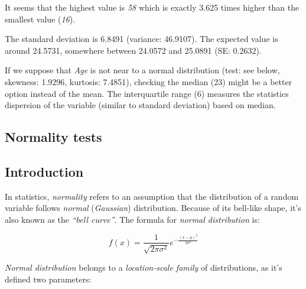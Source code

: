 \documentclass{article}
\begin{document}
It seems that the highest value is \emph{58} which is exactly 3.625
times higher than the smallest value (\emph{16}).

The standard deviation is 6.8491 (variance: 46.9107). The expected value
is around 24.5731, somewhere between 24.0572 and 25.0891 (SE: 0.2632).

If we suppose that \emph{Age} is not near to a normal distribution
(test: see below, skewness: 1.9296, kurtosis: 7.4851), checking the
median (23) might be a better option instead of the mean. The
interquartile range (6) measures the statistics dispersion of the
variable (similar to standard deviation) based on median.

\subsection{Normality tests}

\subsection{Introduction}

In statistics, \emph{normality} refers to an assumption that the
distribution of a random variable follows \emph{normal}
(\emph{Gaussian}) distribution. Because of its bell-like shape, it's
also known as the \emph{``bell curve''}. The formula for \emph{normal
distribution} is:

\[f(x) = \frac{1}{\sqrt{2\pi{}\sigma{}^2}} e^{-\frac{(x-\mu{})^2}{2\sigma{}^2}}\]

\emph{Normal distribution} belongs to a \emph{location-scale family} of
distributions, as it's defined two parameters:
\end{document}
